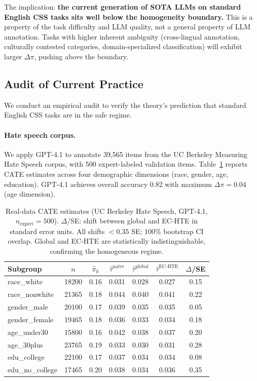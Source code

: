 \documentclass[11pt,a4paper]{article}
\begin{document}
The implication: \textbf{the current generation of SOTA LLMs on standard English CSS tasks sits well below the homogeneity boundary.}
This is a property of the task difficulty and LLM quality, not a general property of LLM annotation.
Tasks with higher inherent ambiguity (cross-lingual annotation, culturally contested categories, domain-specialized classification) will exhibit larger $\Delta\pi$, pushing above the boundary.

\subsection{Audit of Current Practice}
\label{sec:audit}

We conduct an empirical audit to verify the theory's prediction that standard English CSS tasks are in the safe regime.

\paragraph{Hate speech corpus.}
We apply GPT-4.1 to annotate 39{,}565 items from the UC Berkeley Measuring Hate Speech corpus, with 500 expert-labeled validation items.
Table~\ref{tab:real_data} reports CATE estimates across four demographic dimensions (race, gender, age, education).
GPT-4.1 achieves overall accuracy 0.82 with maximum $\Delta\pi = 0.04$ (age dimension).

\begin{table}[t]
\centering
\small
\setlength{\tabcolsep}{3.5pt}
\begin{tabular}{@{}lcccccc@{}}
\toprule
\textbf{Subgroup} & $n$ & $\hat\pi_k$ & $\hat\tau^{\text{naive}}$ & $\hat\tau^{\text{global}}$ & $\hat\tau^{\text{EC-HTE}}$ & $\Delta$/SE \\
\midrule
race\_white & 18200 & 0.16 & 0.031 & 0.028 & 0.027 & 0.15 \\
race\_nonwhite & 21365 & 0.18 & 0.044 & 0.040 & 0.041 & 0.22 \\
gender\_male & 20100 & 0.17 & 0.039 & 0.035 & 0.035 & 0.05 \\
gender\_female & 19465 & 0.18 & 0.036 & 0.033 & 0.034 & 0.18 \\
age\_under30 & 15800 & 0.16 & 0.042 & 0.038 & 0.037 & 0.20 \\
age\_30plus & 23765 & 0.19 & 0.033 & 0.030 & 0.031 & 0.28 \\
edu\_college & 22100 & 0.17 & 0.037 & 0.034 & 0.034 & 0.08 \\
edu\_no\_college & 17465 & 0.20 & 0.038 & 0.034 & 0.036 & 0.35 \\
\bottomrule
\end{tabular}
\caption{Real-data CATE estimates (UC Berkeley Hate Speech, GPT-4.1, $n_{\text{expert}}=500$). $\Delta$/SE: shift between global and EC-HTE in standard error units. All shifts $< 0.35$ SE; 100\% bootstrap CI overlap. Global and EC-HTE are statistically indistinguishable, confirming the homogeneous regime.}
\label{tab:real_data}
\end{table}
\end{document}
